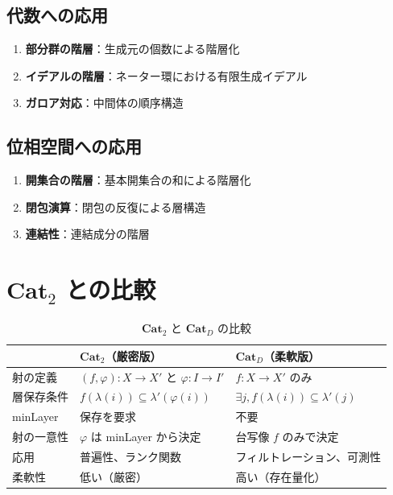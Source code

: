 \documentclass[a4paper,12pt]{ltjsarticle}
\begin{document}
\subsection{代数への応用}

\begin{enumerate}
  \item \textbf{部分群の階層}：生成元の個数による階層化
  \item \textbf{イデアルの階層}：ネーター環における有限生成イデアル
  \item \textbf{ガロア対応}：中間体の順序構造
\end{enumerate}

\subsection{位相空間への応用}

\begin{enumerate}
  \item \textbf{開集合の階層}：基本開集合の和による階層化
  \item \textbf{閉包演算}：閉包の反復による層構造
  \item \textbf{連結性}：連結成分の階層
\end{enumerate}

\section{$\mathbf{Cat}_2$ との比較}

\begin{table}[h]
\centering
\begin{tabular}{|l|l|l|}
\hline
& $\mathbf{Cat}_2$（厳密版） & $\mathbf{Cat}_D$（柔軟版） \\
\hline
\hline
射の定義 & $(f, \varphi): X \to X'$ と $\varphi: I \to I'$ & $f: X \to X'$ のみ \\
\hline
層保存条件 & $f(\lambda(i)) \subseteq \lambda'(\varphi(i))$ & $\exists j, f(\lambda(i)) \subseteq \lambda'(j)$ \\
\hline
minLayer & 保存を要求 & 不要 \\
\hline
射の一意性 & $\varphi$ は minLayer から決定 & 台写像 $f$ のみで決定 \\
\hline
応用 & 普遍性、ランク関数 & フィルトレーション、可測性 \\
\hline
柔軟性 & 低い（厳密） & 高い（存在量化） \\
\hline
\end{tabular}
\caption{$\mathbf{Cat}_2$ と $\mathbf{Cat}_D$ の比較}
\end{table}
\end{document}
